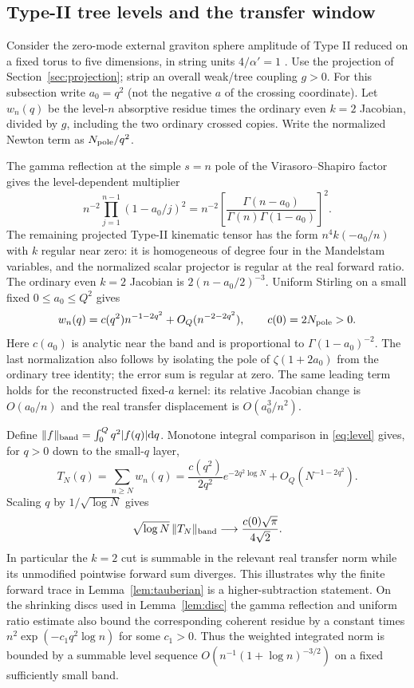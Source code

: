 \documentclass[11pt,a4paper]{article}
\theoremstyle{definition}
\theoremstyle{remark}
\newcommand{\dS}{\mathrm{d}}
\begin{document}
\subsection{Type-II tree levels and the transfer window}
Consider the zero-mode external graviton sphere amplitude of Type II reduced on a fixed torus to five dimensions, in string units $4/\alpha'=1$ \cite[App.~C]{CHLi}. Use the projection of Section~\ref{sec:projection}; strip an overall weak/tree coupling $g>0$. For this subsection write $a_0=q^2$ (not the negative $a$ of the crossing coordinate). Let $w_n(q)$ be the level-$n$ absorptive residue times the ordinary even $k=2$ Jacobian, divided by $g$, including the two ordinary crossed copies. Write the normalized Newton term as $N_{\rm pole}/q^2$.

The gamma reflection at the simple $s=n$ pole of the Virasoro--Shapiro factor gives the level-dependent multiplier
\[
  n^{-2}\prod_{j=1}^{n-1}(1-a_0/j)^2
    =n^{-2}\left[
        \frac{\Gamma(n-a_0)}
             {\Gamma(n)\Gamma(1-a_0)}\right]^2 .
\]
The remaining projected Type-II kinematic tensor has the form
$n^4k(-a_0/n)$ with $k$ regular near zero: it is homogeneous of degree four in the Mandelstam variables, and the normalized scalar projector is regular at the real forward ratio. The ordinary even $k=2$ Jacobian is $2(n-a_0/2)^{-3}$. Uniform Stirling on a small fixed $0\le a_0\le Q^2$ gives
\begin{equation}\label{eq:level}
  w_n(q)=c(q^2)n^{-1-2q^2}
               +O_Q(n^{-2-2q^2}),\qquad c(0)=2N_{\rm pole}>0 .
\end{equation}
Here $c(a_0)$ is analytic near the band and is proportional to $\Gamma(1-a_0)^{-2}$. The last normalization also follows by isolating the pole of $\zeta(1+2a_0)$ from the ordinary tree identity; the error sum is regular at zero. The same leading term holds for the reconstructed fixed-$a$ kernel: its relative Jacobian change is $O(a_0/n)$ and the real transfer displacement is $O(a_0^3/n^2)$.

Define $\|f\|_{\rm band}=\int_0^Q q^2 |f(q)|\dS q$. Monotone integral comparison in \eqref{eq:level} gives, for $q>0$ down to the small-$q$ layer,
\[
 T_N(q)=\sum_{n\ge N}w_n(q)
   =\frac{c(q^2)}{2q^2}e^{-2q^2\log N}
                  +O_Q(N^{-1-2q^2}).
\]
Scaling $q$ by $1/\sqrt{\log N}$ gives
\begin{equation}\label{eq:tail}
 \sqrt{\log N}\,\|T_N\|_{\rm band}
      \longrightarrow \frac{c(0)\sqrt\pi}{4\sqrt2}.
\end{equation}
In particular the $k=2$ cut is summable in the relevant real transfer norm while its unmodified pointwise forward sum diverges. This illustrates why the finite forward trace in Lemma~\ref{lem:tauberian} is a higher-subtraction statement. On the shrinking discs used in Lemma~\ref{lem:disc} the gamma reflection and uniform ratio estimate also bound the corresponding coherent residue by a constant times $n^2\exp(-c_1q^2\log n)$ for some $c_1>0$. Thus the weighted integrated norm is bounded by a summable level sequence $O(n^{-1}(1+\log n)^{-3/2})$ on a fixed sufficiently small band.
\end{document}

